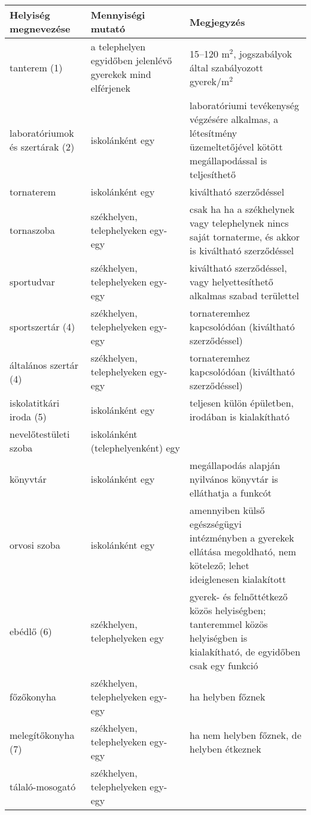 \begin{longtable}[]{@{}>{\begin{minipage}{.3\textwidth}\raggedright
\strut}l<{\strut\end{minipage}}>{\begin{minipage}{.3\textwidth}\raggedright
\strut}l<{\strut\end{minipage}}>{\begin{minipage}{.4\textwidth}\raggedright
\strut}l<{\strut\end{minipage}}@{}}
\textbf{Helyiség megnevezése} &
\textbf{Mennyiségi mutató} &
\textbf{Megjegyzés}\tabularnewline
\hline
\endhead
tanterem (1) &
a telephelyen egyidőben jelenlévő gyerekek mind elférjenek &
15--120 m$^2$, jogszabályok által szabályozott gyerek/m$^2$
\tabularnewline
\hline
laboratóriumok és szertárak (2) &
iskolánként egy &
laboratóriumi tevékenység végzésére alkalmas, a létesítmény üzemeltetőjével
kötött megállapodással is teljesíthető
\tabularnewline
\hline
tornaterem &
iskolánként egy &
kiváltható szerződéssel
\tabularnewline
\hline
tornaszoba &
székhelyen, telephelyeken egy-egy &
csak ha ha a székhelynek vagy telephelynek nincs saját tornaterme, és akkor
is kiváltható szerződéssel
\tabularnewline
\hline
sportudvar &
székhelyen, telephelyeken egy-egy &
kiváltható szerződéssel, vagy helyettesíthető alkalmas szabad
területtel
\tabularnewline
\hline
sportszertár (4) &
székhelyen, telephelyeken egy-egy &
tornateremhez kapcsolódóan (kiváltható szerződéssel)
\tabularnewline
\hline
általános szertár (4) &
székhelyen, telephelyeken egy-egy &
tornateremhez kapcsolódóan (kiváltható szerződéssel)
\tabularnewline
\hline
iskolatitkári iroda (5) &
iskolánként egy &
teljesen külön épületben, irodában is kialakítható
\tabularnewline
\hline
nevelőtestületi szoba &
iskolánként (telephelyenként) egy &
\tabularnewline
\hline
könyvtár &
iskolánként egy &
megállapodás alapján nyilvános könyvtár is elláthatja a funkcót
\tabularnewline
\hline
orvosi szoba &
iskolánként egy &
amennyiben külső egészségügyi intézményben a gyerekek ellátása
megoldható, nem kötelező; lehet ideiglenesen kialakított
\tabularnewline
\hline
ebédlő (6) &
székhelyen, telephelyeken egy &
gyerek- és felnőttétkező közös helyiségben; tanteremmel közös helyiségben
is kialakítható, de egyidőben csak egy funkció
\tabularnewline
\hline
főzőkonyha &
székhelyen, telephelyeken egy-egy &
ha helyben főznek
\tabularnewline
\hline
melegítőkonyha (7) &
székhelyen, telephelyeken egy-egy &
ha nem helyben főznek, de helyben étkeznek
\tabularnewline
\hline
tálaló-mosogató &
székhelyen, telephelyeken egy-egy &

\end{longtable}
